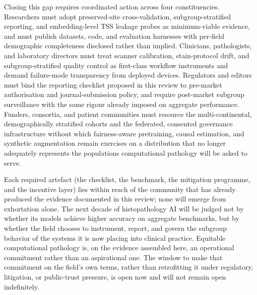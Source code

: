 Closing this gap requires coordinated action across four constituencies. Researchers must adopt preserved-site cross-validation, subgroup-stratified reporting, and embedding-level TSS leakage probes as minimum-viable evidence, and must publish datasets, code, and evaluation harnesses with per-field demographic completeness disclosed rather than implied. Clinicians, pathologists, and laboratory directors must treat scanner calibration, stain-protocol drift, and subgroup-stratified quality control as first-class workflow instruments and demand failure-mode transparency from deployed devices. Regulators and editors must bind the reporting checklist proposed in this review to pre-market authorisation and journal-submission policy, and require post-market subgroup surveillance with the same rigour already imposed on aggregate performance. Funders, consortia, and patient communities must resource the multi-continental, demographically stratified cohorts and the federated, consented governance infrastructure without which fairness-aware pretraining, causal estimation, and synthetic augmentation remain exercises on a distribution that no longer adequately represents the populations computational pathology will be asked to serve.

Each required artefact (the checklist, the benchmark, the mitigation programme, and the incentive layer) lies within reach of the community that has already produced the evidence documented in this review; none will emerge from exhortation alone. The next decade of histopathology AI will be judged not by whether its models achieve higher accuracy on aggregate benchmarks, but by whether the field chooses to instrument, report, and govern the subgroup behavior of the systems it is now placing into clinical practice. Equitable computational pathology is, on the evidence assembled here, an operational commitment rather than an aspirational one. The window to make that commitment on the field's own terms, rather than retrofitting it under regulatory, litigation, or public-trust pressure, is open now and will not remain open indefinitely.
